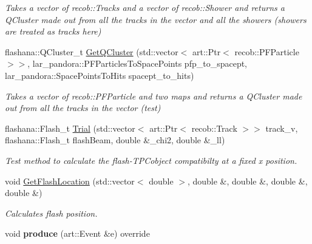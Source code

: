 \begin{DoxyCompactItemize}
\begin{DoxyCompactList}\small\item\em Takes a vector of recob\-::\-Tracks and a vector of recob\-::\-Shower and returns a Q\-Cluster made out from all the tracks in the vector and all the showers (showers are treated as tracks here) \end{DoxyCompactList}\item 
\hypertarget{classNeutrinoFlashMatch_a93132a117b6ea907ba95bba4a6af6107}{flashana\-::\-Q\-Cluster\-\_\-t \hyperlink{classNeutrinoFlashMatch_a93132a117b6ea907ba95bba4a6af6107}{Get\-Q\-Cluster} (std\-::vector$<$ art\-::\-Ptr$<$ recob\-::\-P\-F\-Particle $>$$>$, lar\-\_\-pandora\-::\-P\-F\-Particles\-To\-Space\-Points pfp\-\_\-to\-\_\-spacept, lar\-\_\-pandora\-::\-Space\-Points\-To\-Hits spacept\-\_\-to\-\_\-hits)}\label{classNeutrinoFlashMatch_a93132a117b6ea907ba95bba4a6af6107}

\begin{DoxyCompactList}\small\item\em Takes a vector of recob\-::\-P\-F\-Particle and two maps and returns a Q\-Cluster made out from all the tracks in the vector (test) \end{DoxyCompactList}\item 
\hypertarget{classNeutrinoFlashMatch_aa957152a8c232e4b23cc7544aa6bfdd1}{flashana\-::\-Flash\-\_\-t \hyperlink{classNeutrinoFlashMatch_aa957152a8c232e4b23cc7544aa6bfdd1}{Trial} (std\-::vector$<$ art\-::\-Ptr$<$ recob\-::\-Track $>$$>$ track\-\_\-v, flashana\-::\-Flash\-\_\-t flash\-Beam, double \&\-\_\-chi2, double \&\-\_\-ll)}\label{classNeutrinoFlashMatch_aa957152a8c232e4b23cc7544aa6bfdd1}

\begin{DoxyCompactList}\small\item\em Test method to calculate the flash-\/\-T\-P\-Cobject compatibilty at a fixed x position. \end{DoxyCompactList}\item 
\hypertarget{classNeutrinoFlashMatch_a744d4b00dfaaadf0c451652092e01b85}{void \hyperlink{classNeutrinoFlashMatch_a744d4b00dfaaadf0c451652092e01b85}{Get\-Flash\-Location} (std\-::vector$<$ double $>$, double \&, double \&, double \&, double \&)}\label{classNeutrinoFlashMatch_a744d4b00dfaaadf0c451652092e01b85}

\begin{DoxyCompactList}\small\item\em Calculates flash position. \end{DoxyCompactList}\item 
\hypertarget{classNeutrinoFlashMatch_a00578af5672ff925f80c1b9482c8b4ff}{void {\bfseries produce} (art\-::\-Event \&e) override}\label{classNeutrinoFlashMatch_a00578af5672ff925f80c1b9482c8b4ff}

\end{DoxyCompactItemize}


